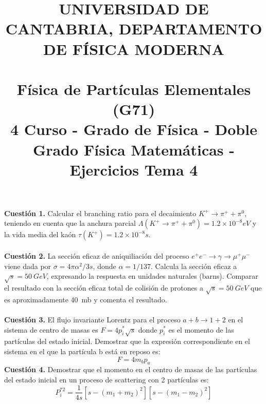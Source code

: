 \documentclass[paper=a4, fontsize=11pt]{scrartcl} %
\date{}
\title{	
\normalfont \normalsize 
\textsc{UNIVERSIDAD DE CANTABRIA, DEPARTAMENTO DE FÍSICA MODERNA} \\ [20pt] %
\horrule{0.5pt} \\[0.4cm] %
\huge Física de Partículas Elementales (G71) \\ %
\normalsize 4 Curso - Grado de Física - Doble Grado Física Matemáticas - Ejercicios Tema 4
\horrule{2pt} \\[0.5cm] %
}
\numberwithin{equation}{section} %
\numberwithin{figure}{section} %
\numberwithin{table}{section} %
\begin{document}
\maketitle %

\vspace{-2.5cm}

\textbf{Cuestión 1.} Calcular el branching ratio para el decaimiento $K^+\rightarrow\pi^+ + \pi^0$, teniendo en cuenta que la anchura parcial $\Lambda (K^+\rightarrow\pi^+ + \pi^0)=1.2\times 10^{-8}eV$ y 
la vida media del kaón $\tau(K^+)=1.2\times 10^{-8}s$.
\\
\\
\textbf{Cuestión 2.} La sección eficaz de aniquiliación del proceso $e^+e^-\rightarrow\gamma\rightarrow\mu^+\mu^-$ viene dada por $\sigma =4\pi\alpha^2/3s$, donde $\alpha =1/137$. Calcula
la sección eficaz a $\sqrt{s}=50~GeV$, expresando la respuesta en unidades naturales (barns). Comparar el resultado con la sección eficaz total de colisión de protones a $\sqrt{s}=50~GeV$
que es aproximadamente 40~mb y comenta el resultado. 
\\
\\
\textbf{Cuestión 3.} El flujo invariante Lorentz para el proceso $a + b\rightarrow 1 + 2$ en el sistema de centro de masas es $F=4p^*_i\sqrt{s}$ donde $p^*_i$ es el momento de las partículas
del estado inicial. Demostrar que la expresión correspondiente en el sistema en el que la partícula b está en reposo es:
\begin{equation*}
F=4m_bp_a
\end{equation*}
\textbf{Cuestión 4.} Demostrar que el momento en el centro de masas de las partículas del estado inicial en un proceso de scattering con 2 partículas es:
\begin{equation*}
P_i^{*2}=\frac{1}{4s}[s - (m_1+m_2)^2][s - (m_1-m_2)^2]
\end{equation*}
\end{document}
